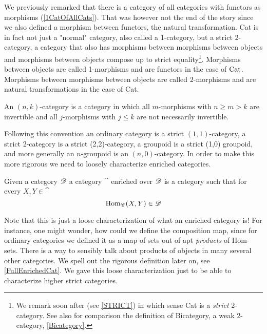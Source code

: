 \begin{rem}
    We previously remarked that there is a category of all categories with functors as morphisms (\ref{1CatOfAllCats}). That was however not the end of the story since we also defined a morphism between functors, the natural transformation. Cat is in fact not just a "normal" category, also called a 1-category, but a strict 2-category, a category that also has morphisms between morphisms between objects and morphisms between objects compose up to strict equality\footnote{We remark soon after (see \ref{STRICT}) in which sense Cat is a \emph{strict} 2-category. See also for comparison the definition of Bicategory, a weak 2-category, \ref{Bicategory}.}. Morphisms between objects are called 1-morphisms and are functors in the case of $\operatorname{Cat}$. Morphisms between morphisms between objects are called $2$-morphisms and are natural transformations in the case of Cat. 
\end{rem}
\begin{notat}
    An $(n,k)$-category is a category in which all $m$-morphisms with $n\geq m>k$ are invertible and all $j$-morphisms with $j\leq k$ are not necessarily invertible.
\end{notat}
\noindent Following this convention an ordinary category is a strict $(1,1)$-category, a strict 2-category is a strict (2,2)-category, a groupoid is a strict (1,0) groupoid, and more generally an $n$-groupoid is an $(n,0)$-category. In order to make this more rigorous we need to loosely characterize enriched categories.
\begin{defn}\label{loose enriched Cat}
    Given a category $\mathscr{D}$ a category $\cat$ enriched over $\mathscr{D}$ is a category such that for every $X,Y\in\cat$ $$\operatorname{Hom}_{\mathscr{C}}(X,Y)\in\mathscr{D}$$
\end{defn}
\begin{rem}
    Note that this is just a loose characterization of what an enriched category is! For instance, one might wonder, how could we define the composition map, since for ordinary categories we defined it as a map of sets out of apt \emph{products} of Hom-sets. There is a way to sensibly talk about products of objects in many several other categories. We spell out the rigorous definition later on, see \ref{FullEnrichedCat}. We gave this loose characterization just to be able to characterize higher strict categories.
\end{rem}
